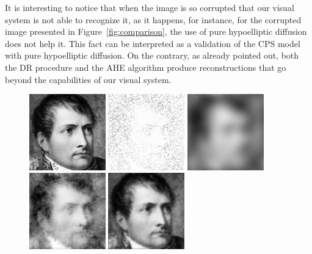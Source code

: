 \documentclass[proc]{edpsmath}
\begin{document}
It is interesting to notice that when the image is so corrupted that our visual system is not able to recognize it, as it happens, for instance, for the corrupted image presented in Figure~\ref{fig:comparison}, the use of pure hypoelliptic diffusion does not help it.
This fact can be interpreted as a validation of the CPS model with pure hypoelliptic diffusion. On the contrary, as already pointed out, both the DR procedure and the AHE algorithm produce reconstructions that go beyond the capabilities of our visual system.






\begin{figure}
  \includegraphics[height = 3.3cm]{imgs/napo-orig}
  \includegraphics[height = 3.3cm]{imgs/napo-corr}
  \includegraphics[height = 3.3cm]{imgs/napo-PH}
  \includegraphics[height = 3.3cm]{imgs/napo-DR}
  \includegraphics[height = 3.3cm]{imgs/napo-AHE}

\end{figure}
\end{document}
